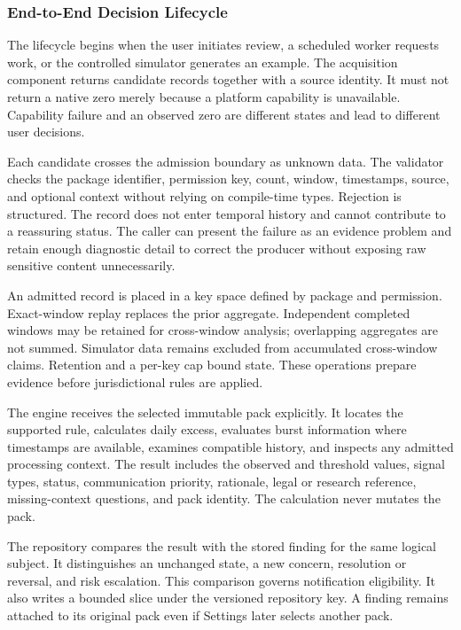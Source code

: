\subsubsection{End-to-End Decision Lifecycle}

The lifecycle begins when the user initiates review, a scheduled worker requests work, or the controlled simulator generates an example. The acquisition component returns candidate records together with a source identity. It must not return a native zero merely because a platform capability is unavailable. Capability failure and an observed zero are different states and lead to different user decisions.

Each candidate crosses the admission boundary as unknown data. The validator checks the package identifier, permission key, count, window, timestamps, source, and optional context without relying on compile-time types. Rejection is structured. The record does not enter temporal history and cannot contribute to a reassuring status. The caller can present the failure as an evidence problem and retain enough diagnostic detail to correct the producer without exposing raw sensitive content unnecessarily.

An admitted record is placed in a key space defined by package and permission. Exact-window replay replaces the prior aggregate. Independent completed windows may be retained for cross-window analysis; overlapping aggregates are not summed. Simulator data remains excluded from accumulated cross-window claims. Retention and a per-key cap bound state. These operations prepare evidence before jurisdictional rules are applied.

The engine receives the selected immutable pack explicitly. It locates the supported rule, calculates daily excess, evaluates burst information where timestamps are available, examines compatible history, and inspects any admitted processing context. The result includes the observed and threshold values, signal types, status, communication priority, rationale, legal or research reference, missing-context questions, and pack identity. The calculation never mutates the pack.

The repository compares the result with the stored finding for the same logical subject. It distinguishes an unchanged state, a new concern, resolution or reversal, and risk escalation. This comparison governs notification eligibility. It also writes a bounded slice under the versioned repository key. A finding remains attached to its original pack even if Settings later selects another pack.

